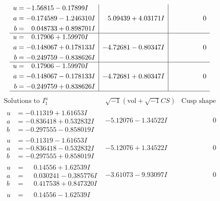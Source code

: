 \documentclass[1p]{elsarticle_modified}
\theoremstyle{definition}
\newcommand{\I}{\sqrt{-1}}
\begin{document}
$$\begin{array}{c|c|c}
\begin{aligned}
u &= -1.56815 - 0.17899 I \\
a &= -0.174589 - 1.246310 I \\
b &= \phantom{-}0.048733 + 0.898701 I\end{aligned}
 & \phantom{-}5.09439 + 4.03171 I & \phantom{-0.000000 } 0 \\ \hline\begin{aligned}
u &= \phantom{-}0.17906 + 1.59970 I \\
a &= -0.148067 + 0.178133 I \\
b &= -0.249759 - 0.838626 I\end{aligned}
 & -4.72681 - 0.80347 I & \phantom{-0.000000 } 0 \\ \hline\begin{aligned}
u &= \phantom{-}0.17906 - 1.59970 I \\
a &= -0.148067 - 0.178133 I \\
b &= -0.249759 + 0.838626 I\end{aligned}
 & -4.72681 + 0.80347 I & \phantom{-0.000000 } 0\\
 \hline 
 \end{array}$$\newpage$$\begin{array}{c|c|c}  
\text{Solutions to }I^u_{1}& \I (\text{vol} + \sqrt{-1}CS) & \text{Cusp shape}\\
 \hline 
\begin{aligned}
u &= -0.11319 + 1.61653 I \\
a &= -0.836418 + 0.532832 I \\
b &= -0.297555 - 0.858019 I\end{aligned}
 & -5.12076 - 1.34522 I & \phantom{-0.000000 } 0 \\ \hline\begin{aligned}
u &= -0.11319 - 1.61653 I \\
a &= -0.836418 - 0.532832 I \\
b &= -0.297555 + 0.858019 I\end{aligned}
 & -5.12076 + 1.34522 I & \phantom{-0.000000 } 0 \\ \hline\begin{aligned}
u &= \phantom{-}0.14556 + 1.62539 I \\
a &= \phantom{-}0.030241 - 0.385776 I \\
b &= \phantom{-}0.417538 + 0.847320 I\end{aligned}
 & -3.61073 - 9.93097 I & \phantom{-0.000000 } 0 \\ \hline\begin{aligned}
u &= \phantom{-}0.14556 - 1.62539 I \\

\end{aligned}
\end{array}$$
\end{document}
